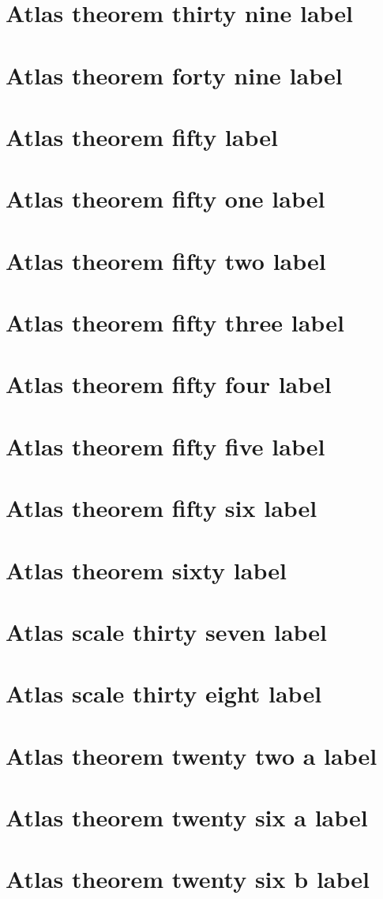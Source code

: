 \documentclass[11pt]{article}
\theoremstyle{definition}
\begin{document}
\section{Atlas theorem thirty nine label}
\label{ll:labels:atlas-t39}
\section{Atlas theorem forty nine label}
\label{ll:labels:atlas-t49}
\section{Atlas theorem fifty label}
\label{ll:labels:atlas-t50}
\section{Atlas theorem fifty one label}
\label{ll:labels:atlas-t51}
\section{Atlas theorem fifty two label}
\label{ll:labels:atlas-t52}
\section{Atlas theorem fifty three label}
\label{ll:labels:atlas-t53}
\section{Atlas theorem fifty four label}
\label{ll:labels:atlas-t54}
\section{Atlas theorem fifty five label}
\label{ll:labels:atlas-t55}
\section{Atlas theorem fifty six label}
\label{ll:labels:atlas-t56}
\section{Atlas theorem sixty label}
\label{ll:labels:atlas-t60}
\section{Atlas scale thirty seven label}
\label{ll:labels:atlas-s37}
\section{Atlas scale thirty eight label}
\label{ll:labels:atlas-s38}
\section{Atlas theorem twenty two a label}
\label{ll:labels:atlas-t22a}
\section{Atlas theorem twenty six a label}
\label{ll:labels:atlas-t26a}
\section{Atlas theorem twenty six b label}
\label{ll:labels:atlas-t26b}
\end{document}
